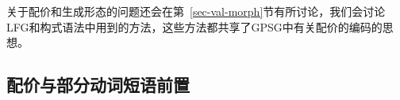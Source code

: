 关于配价和生成形态的问题还会在第~\ref{sec-val-morph}节有所讨论，我们会讨论LFG\indexlfg 和构式语法\indexcxg 中用到的方法，这些方法都共享了GPSG中有关配价的编码的思想。

\subsection{配价与部分动词短语前置}

